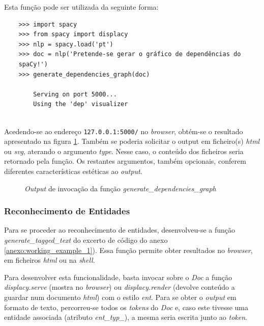 \documentclass[12pt]{article}
\begin{document}
Esta função pode ser utilizada da seguinte forma:

\begin{verbatim}
	>>> import spacy
	>>> from spacy import displacy
	>>> nlp = spacy.load('pt')
	>>> doc = nlp('Pretende-se gerar o gráfico de dependências do
	spaCy!')
	>>> generate_dependencies_graph(doc)

		Serving on port 5000...
		Using the 'dep' visualizer
	
\end{verbatim}

Acedendo-se ao endereço \texttt{127.0.0.1:5000/} no \textit{browser}, obtém-se o resultado apresentado na figura \ref{figure:dependencies-graph}. Também se poderia solicitar o output em ficheiro(s) \textit{html} ou \textit{svg}, aterando o argumento \textit{type}. Nesse caso, o conteúdo dos ficheiros seria retornado pela função. Os restantes argumentos, também opcionais, conferem diferentes características estéticas ao \textit{output}.

\begin{figure}[!ht]
	\centering
	\setlength{\abovecaptionskip}{-.5cm}
	\caption{\textit{Output} de invocação da função \textit{generate\_dependencies\_graph}}
	\label{figure:dependencies-graph}
\end{figure}


\subsubsection{Reconhecimento de Entidades}

Para se proceder ao reconhecimento de entidades, desenvolveu-se a função \textit{generate\_tagged\_text} do excerto de código do anexo \ref{anexo:working_example_1}). Essa função permite obter resultados no \textit{browser}, em ficheiros \textit{html} ou na \textit{shell}. 

Para desenvolver esta funcionalidade, basta invocar sobre o \textit{Doc} a função \textit{displacy.serve} (mostra no \textit{browser}) ou \textit{displacy.render} (devolve conteúdo a guardar num documento \textit{html}) com o estilo \textit{ent}. Para se obter o \textit{output} em formato de texto, percorreu-se todos os \textit{tokens} do \textit{Doc} e, caso este tivesse uma entidade associada (atributo \textit{ent\_typ\_}), a mesma seria escrita junto ao \textit{token}.
\end{document}
